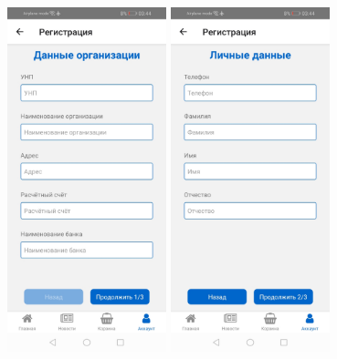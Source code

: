 \begin{figure}[!p]\centering
    \begin{minipage}{0.24\textwidth}
        \centering

        \includegraphics[height=10cm]
        {images/android/account-registration-step1.jpg}
    \end{minipage}
    \begin{minipage}{0.24\textwidth}
        \centering

        \includegraphics[height=10cm]
        {images/android/account-registration-step2.jpg}
    \end{minipage}
    \begin{minipage}{0.24\textwidth}
        \centering


\end{minipage}
\end{figure}
